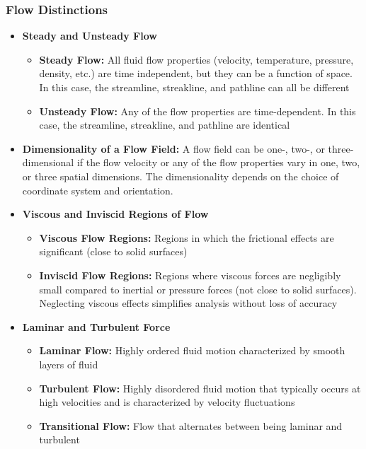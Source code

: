 \documentclass[11pt]{article}
\begin{document}
\subsubsection{Flow Distinctions}
\begin{itemize}
\item \textbf{Steady and Unsteady Flow}
\begin{itemize}
\item \textbf{Steady Flow:} All fluid flow properties (velocity, temperature, pressure, density, etc.) are time independent, but they can be a function of space. In this case, the streamline, streakline, and pathline can all be different
\item \textbf{Unsteady Flow:} Any of the flow properties are time-dependent. In this case, the streamline, streakline, and pathline are identical
\end{itemize}
\item \textbf{Dimensionality of a Flow Field:} A flow field can be one-, two-, or three- dimensional if the flow velocity or any of the flow properties vary in one, two, or three spatial dimensions. The dimensionality depends on the choice of coordinate system and orientation.
\item \textbf{Viscous and Inviscid Regions of Flow} 
\begin{itemize}
\item \textbf{Viscous Flow Regions:} Regions in which the frictional effects are significant (close to solid surfaces)
\item \textbf{Inviscid Flow Regions:} Regions where  viscous forces are negligibly small compared to inertial or pressure forces (not close to solid surfaces). Neglecting viscous effects simplifies analysis without loss of accuracy
\end{itemize}
\item \textbf{Laminar and Turbulent Force}
\begin{itemize}
\item \textbf{Laminar Flow:} Highly ordered fluid motion characterized by smooth layers of fluid
\item \textbf{Turbulent Flow:} Highly disordered fluid motion that typically occurs at high velocities and is characterized by velocity fluctuations
\item \textbf{Transitional Flow:} Flow that alternates between being laminar and turbulent
\end{itemize}
\end{itemize}
\end{document}

